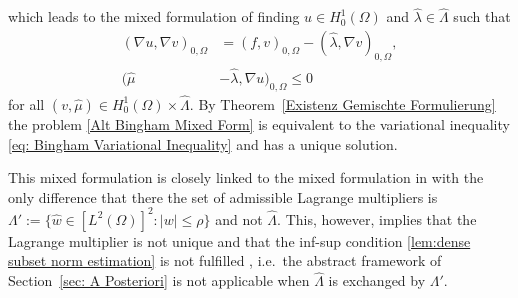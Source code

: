 \documentclass[12pt,twoside,reqno]{amsart}
\theoremstyle{definition}
\numberwithin{equation}{section}
\begin{document}
        which leads to the mixed formulation of finding $u\in H^1_0(\Omega)$ and $\hat\lambda\in \hat\Lambda$ such that
        \begin{subequations}\label{Alt Bingham Mixed Form}
            \begin{align}
                (\nabla u,\nabla v)_{0,\Omega} &= (f,v)_{0,\Omega}-(\hat\lambda,\nabla v)_{0,\Omega},\\
                (\hat \mu&-\hat\lambda, \nabla u)_{0,\Omega}\leq 0
            \end{align}
        \end{subequations}
        for all $(v,\hat\mu)\in H^1_0(\Omega) \times \hat\Lambda$. By Theorem~\ref{Existenz Gemischte Formulierung} the problem \eqref{Alt Bingham Mixed Form} is equivalent to the variational inequality \eqref{eq: Bingham Variational Inequality} and has a unique solution.

This mixed formulation is closely linked to the mixed formulation in \cite[Ch.~II]{Glowinski1984} with the only difference that there the set of admissible Lagrange multipliers is $\Lambda':=\{\hat{w}\in [L^2(\Omega)]^2: |w|\leq\rho\}$ and  not $\hat\Lambda$. This, however, implies that the Lagrange multiplier is not unique and that the inf-sup condition \eqref{lem:dense subset norm estimation} is not fulfilled , i.e.~the abstract framework of Section~\ref{sec: A Posteriori} is not applicable when $\hat{\Lambda}$ is exchanged by $\Lambda'$. 
\end{document}
